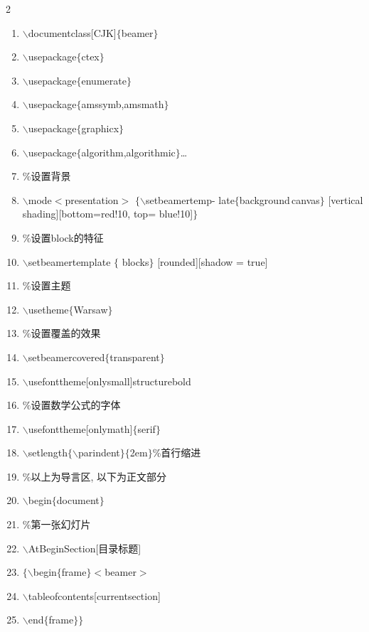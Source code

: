 \begin{multicols}{2}
\begin{enumerate}
\renewcommand{\labelenumi}{\theenumi}
  \item $\backslash$documentclass[CJK]$\{$beamer$\}$
  \item $\backslash$usepackage$\{$ctex$\}$
  \item $\backslash$usepackage$\{$enumerate$\}$
  \item$\backslash$usepackage$\{$amssymb,amsmath$\}$
  \item$\backslash$usepackage$\{$graphicx$\}$
\item $\backslash$usepackage$\{$algorithm,algorithmic$\}$\ldots
\item \%设置背景
\item $\backslash$mode$<$presentation$>$
  $\{\backslash$setbeamertemp- late\!$\{\!$background\,canvas\!$\}$ [vertical shading][bottom=red!10, top= blue!10]$\}$
\item$\%$设置block的特征
\item$\backslash$setbeamertemplate $\{$ blocks$\}$ [rounded][shadow = true]
\item$\%$设置主题
\item$\backslash$usetheme$\{$Warsaw$\}$
\item$\%$设置覆盖的效果
\item$\backslash$setbeamercovered$\{$transparent$\}$
\item$\backslash$usefonttheme[onlysmall]{structurebold}
\item$\%$设置数学公式的字体
\item$\backslash$usefonttheme[onlymath]$\{$serif$\}$
\item$\backslash$setlength$\{\backslash$parindent$\}\{$2em$\}$\%首行缩进
\item \%{}以上为导言区, 以下为正文部分
\item$\backslash$begin$\{$document$\}$
\item$\%$第一张幻灯片
\item$\backslash$AtBeginSection[目录标题]
\item$\{\backslash$begin$\{$frame$\}<$beamer$>$
\item$\backslash$tableofcontents[currentsection]
\item$\backslash$end$\{$frame$\}\}$

\end{enumerate}
\end{multicols}
